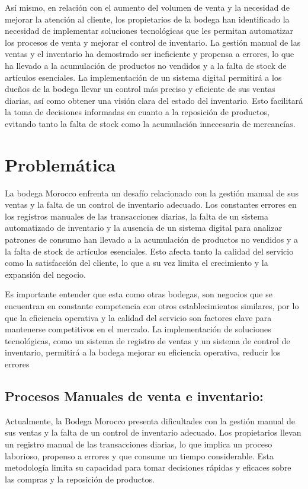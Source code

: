 \documentclass{article}
\begin{document}
  Así mismo, en relación con el aumento del volumen de venta y la necesidad de mejorar la atención al cliente, los propietarios de la bodega han identificado la necesidad de implementar soluciones tecnológicas que les permitan automatizar los procesos de venta y mejorar el control de inventario. La gestión manual de las ventas y el inventario ha demostrado ser ineficiente y propensa a errores, lo que ha llevado a la acumulación de productos no vendidos y a la falta de stock de artículos esenciales. La implementación de un sistema digital permitirá a los dueños de la bodega llevar un control más preciso y eficiente de sus ventas diarias, así como obtener una visión clara del estado del inventario. Esto facilitará la toma de decisiones informadas en cuanto a la reposición de productos, evitando tanto la falta de stock como la acumulación innecesaria de mercancías.

\newpage
\section{Problemática}

  La bodega Morocco enfrenta un desafío relacionado con la gestión manual de sus ventas y la falta de un control de inventario adecuado. Los constantes errores en los registros manuales de las transacciones diarias, la falta de un sistema automatizado de inventario y la ausencia de un sistema digital para analizar patrones de consumo han llevado a la acumulación de productos no vendidos y a la falta de stock de artículos esenciales. Esto afecta tanto la calidad del servicio como la satisfacción del cliente, lo que a su vez limita el crecimiento y la expansión del negocio.

  Es importante entender que esta como otras bodegas, son negocios que se encuentran en constante competencia con otros establecimientos similares, por lo que la eficiencia operativa y la calidad del servicio son factores clave para mantenerse competitivos en el mercado. La implementación de soluciones tecnológicas, como un sistema de registro de ventas y un sistema de control de inventario, permitirá a la bodega mejorar su eficiencia operativa, reducir los errores

  \subsection{Procesos Manuales de venta e inventario:}

  Actualmente, la Bodega Morocco presenta dificultades con la gestión manual de sus ventas y la falta de un control de inventario adecuado. Los propietarios llevan un registro manual de las transacciones diarias, lo que implica un proceso laborioso, propenso a errores y que consume un tiempo considerable. Esta metodología limita su capacidad para tomar decisiones rápidas y eficaces sobre las compras y la reposición de productos.
\end{document}
